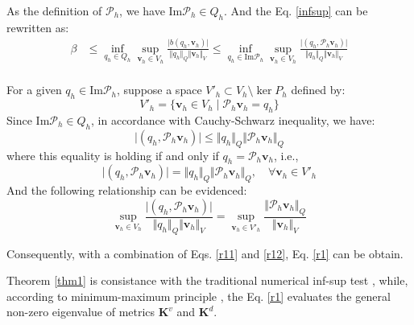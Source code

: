 \begin{pf}
As the definition of  $\mathcal P_h$, we have $\mathrm{Im}\mathcal P_h \in Q_h$. And the Eq. \eqref{infsup} can be rewritten as:
\begin{equation} \label{r11}
\begin{split}
    \beta &\le \inf_{q_h \in Q_h} \sup_{\boldsymbol v_h \in V_h} \frac{\vert b(q_h,\boldsymbol v_h) \vert}{\Vert q_h \Vert_Q \Vert \boldsymbol v_h \Vert_V} 
    \le \inf_{q_h \in \mathrm{Im}\mathcal P_h} \sup_{\boldsymbol v_h \in V_h} \frac{\vert (q_h,\mathcal P_h \boldsymbol v_h) \vert}{\Vert q_h \Vert_Q \Vert \boldsymbol v_h \Vert_V} \\
\end{split}
\end{equation}

For a given $q_h\in \mathrm{Im}\mathcal P_h$, suppose a space $V'_h \subset V_h\setminus \ker P_h$ defined by:
\begin{equation}
    V'_h = \{ \boldsymbol v_h \in V_h \; \vert \; \mathcal P_h \boldsymbol v_h = q_h \}
\end{equation}
Since $\mathrm{Im}\mathcal P_h \in Q_h$, in accordance with Cauchy-Schwarz inequality, we have:
\begin{equation}
    \vert (q_h,\mathcal P_h \boldsymbol v_h) \vert \le \Vert q_h \Vert_Q \Vert \mathcal P_h \boldsymbol v_h \Vert_Q
\end{equation}
where this equality is holding if and only if $q_h=\mathcal P_h \boldsymbol v_h$, i.e.,
\begin{equation}
    \vert (q_h,\mathcal P_h \boldsymbol v_h) \vert = \Vert q_h \Vert_Q \Vert \mathcal P_h \boldsymbol v_h \Vert_Q, \quad \forall \boldsymbol v_h \in V'_h
\end{equation}
And the following relationship can be evidenced:
    \begin{equation}\label{r12}
    \sup_{\boldsymbol v_h\in V_h} \frac{\vert (q_h,\mathcal P_h \boldsymbol v_h) \vert}{\Vert q_h \Vert_Q \Vert \boldsymbol v_h \Vert_V} =
    \sup_{\boldsymbol v_h\in V'_h} \frac{\Vert \mathcal P_h \boldsymbol v_h \Vert_Q}{\Vert \boldsymbol v_h \Vert_V} 
\end{equation}

Consequently, with a combination of Eqs. \eqref{r11} and \eqref{r12}, Eq. \eqref{r1} can be obtain.
\end{pf}

\begin{rmk}
Theorem \ref{thm1} is consistance with the traditional numerical inf-sup test \cite{malkus1981}, while, according to minimum-maximum principle \cite{babuskaa}, the Eq. \eqref{r1} evaluates the general non-zero eigenvalue of metrics $\boldsymbol K^v$ and $\boldsymbol K^d$.
\end{rmk}

